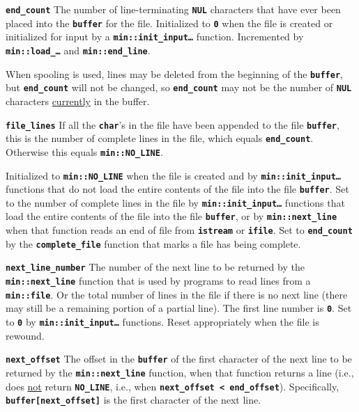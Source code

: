 \documentclass[12pt]{article}
\makeatletter
\newcommand{\TT}[1]{{\tt \bfseries #1}}
\newcommand{\ttmkey}[2]{\TT{#1}\index{#1@{\tt #1}!#2}}
\newcommand{\EOL}{\penalty \exhyphenpenalty}
\newenvironment{itemlist}[1][1.2in]%
	{\begin{list}{}{\setlength{\labelwidth}{#1}%
		        \setlength{\leftmargin}{\labelwidth}%
		        \addtolength{\leftmargin}{+0.2in}%
		        \renewcommand{\makelabel}[1]{##1\hfill}}}%
	{\end{list}}
\makeatother
\begin{document}
\begin{itemlist}[1.4in]
\item[\ttmkey{end\_\EOL count}{in {\tt min::file}}]
The number of line-terminating \TT{NUL} characters that have ever been
placed into the \TT{buffer} for the file.
Initialized to \TT{0} when the file is created or initialized
for input by a \TT{min::\EOL init\_\EOL input\ldots} function.
Incremented by \TT{min::\EOL load\_\ldots} and
\TT{min::\EOL end\_\EOL line}.

When spooling is used, lines may be deleted from the beginning of
the \TT{buffer}, but \TT{end\_\EOL count} will not be changed, so
\TT{end\_\EOL count} may not be the number of \TT{NUL} characters
\underline{currently} in the buffer.

\item[\ttmkey{file\_\EOL lines}{in {\tt min::file}}]
If all the \TT{char}'s in the file have been appended to the file \TT{buffer},
this is the number of complete lines in the file, which equals
\TT{end\_count}. Otherwise this equals \TT{min::\EOL NO\_\EOL LINE}.

Initialized to \TT{min::\EOL NO\_\EOL LINE} when the file is created and by
\TT{min::\EOL init\_\EOL input\ldots} functions that do not load
the entire contents of the file into the file \TT{buffer}.
Set to the number of complete lines in the file
by \TT{min::\EOL init\_\EOL input\ldots} functions that load
the entire contents of the file into the file \TT{buffer}, or
by \TT{min::\EOL next\_\EOL line} when that function
reads an end of file from \TT{istream} or \TT{ifile}.
Set to \TT{end\_count} by the \TT{complete\_file} function that marks
a file has being complete.

\item[\ttmkey{next\_\EOL line\_\EOL number}{in {\tt min::file}}]
The number of the next line to be returned by the
\TT{min::\EOL next\_\EOL line}
function that is used by programs to read lines from a \TT{min::\EOL file}.
Or the total number of lines in the file if there is no next line
(there may still be a remaining portion of a partial line).
The first line number is \TT{0}.
Set to \TT{0} by \TT{min::\EOL init\_\EOL input\ldots} functions.
Reset appropriately when the file is rewound.

\item[\ttmkey{next\_\EOL offset}{in {\tt min::file}}]
The offset in the \TT{buffer} of the first character of the
next line to be returned by the \TT{min::\EOL next\_\EOL line}
function, when that function returns a line (i.e., does \underline{not}
return \TT{NO\_\EOL LINE}, i.e., when \TT{next\_offset < end\_offset}).
Specifically, \TT{buffer[next\_\EOL offset]} is
the first character of the next line.


\end{itemlist}
\end{document}

